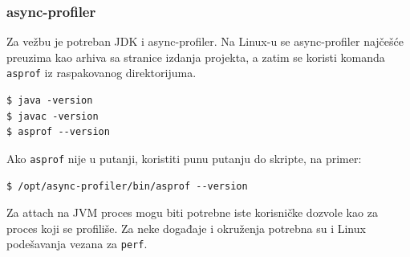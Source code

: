 \subsubsection{async-profiler}\label{instalacija-async-profiler}

Za vežbu je potreban JDK i async-profiler. Na Linux-u se async-profiler najčešće preuzima kao arhiva sa stranice izdanja projekta, a zatim se koristi komanda \texttt{asprof} iz raspakovanog direktorijuma.

\begin{verbatim}
$ java -version
$ javac -version
$ asprof --version
\end{verbatim}

Ako \texttt{asprof} nije u putanji, koristiti punu putanju do skripte, na primer:

\begin{verbatim}
$ /opt/async-profiler/bin/asprof --version
\end{verbatim}

Za attach na JVM proces mogu biti potrebne iste korisničke dozvole kao za proces koji se profiliše. Za neke događaje i okruženja potrebna su i Linux podešavanja vezana za \texttt{perf}.
